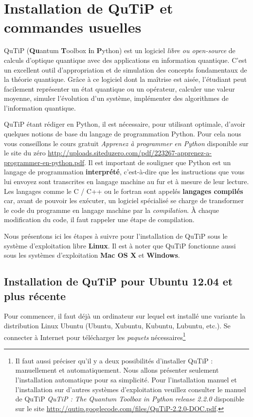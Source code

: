 \chapter{Installation de QuTiP et commandes usuelles}
\label{sec:QuTiP}

QuTiP (\textbf{Qu}antum \textbf{T}oolbox \textbf{i}n \textbf{P}ython) est un 
logiciel \emph{libre ou open-source} de calculs d'optique quantique avec des 
applications en information quantique. C'est un excellent outil d'appropriation 
et de simulation des concepts fondamentaux de la théorie quantique. Grâce à ce 
logiciel dont la maîtrise est aisée, l'étudiant peut facilement représenter un 
état quantique ou un opérateur, calculer une valeur moyenne, simuler l'évolution 
d'un système, implémenter des algorithmes de l'information quantique.

QuTiP étant rédiger en Python, il est nécessaire, pour utilisant optimale, 
d'avoir quelques notions de base du langage de programmation Python. Pour 
cela nous vous conseillons le cours gratuit \emph{Apprenez à programmer 
en Python} disponible sur le site du zéro \url{
http://uploads.siteduzero.com/pdf/223267-apprenez-a-programmer-en-python.pdf}. 
Il est important de souligner que Python est un langage de programmation 
\textbf{interprété}, c'est-à-dire que les instructions que vous lui envoyez sont 
transcrites en langage machine au fur et à mesure de leur lecture. Les langages 
comme le C / C++ ou le fortran sont appelés \textbf{langages compilés} car, 
avant de pouvoir les exécuter, un logiciel spécialisé se charge de transformer 
le code du programme en langage machine par la \emph{compilation}. À chaque 
modification du code, il faut rappeler une étape de compilation.
 
Nous présentons ici les étapes à suivre pour l'installation de QuTiP sous le 
système d'exploitation libre \textbf{Linux}. Il est à noter que QuTiP fonctionne 
aussi sous les systèmes d'exploitation \textbf{Mac OS X} et \textbf{Windows}. 

\section{Installation de QuTiP pour Ubuntu 12.04 et plus récente}

Pour commencer, il faut déjà un ordinateur sur lequel est installé une variante 
la distribution Linux Ubuntu (Ubuntu, Xubuntu, Kubuntu, Lubuntu, etc.). Se 
connecter à Internet pour télécharger les \emph{paquets} nécessaires\footnote{Il 
faut aussi préciser qu'il y a deux possibilités d'installer QuTiP : manuellement 
et automatiquement. Nous allons présenter seulement l'installation automatique 
pour sa simplicité. Pour l'installation manuel et l'installation sur d'autres 
systèmes d'exploitation veuillez consulter le manuel de QuTiP \emph{QuTiP : The 
Quantum Toolbox in Python release 2.2.0} disponible sur le site 
\url{http://qutip.googlecode.com/files/QuTiP-2.2.0-DOC.pdf}.}

